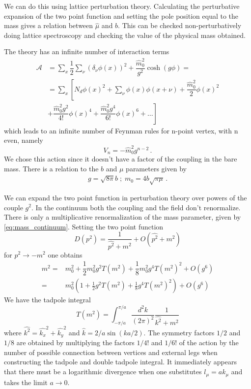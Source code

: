 \documentclass[12pt,a4paper]{report}
\begin{document}
We can do this using lattice perturbation theory. Calculating the perturbative expansion of the two point function and setting the pole position equal to the mass gives a relation between $ \hat \mu$ and $ b$. This can be checked non-perturbatively doing lattice spectroscopy and checking the value of the physical mass obtained.

The theory has an infinite number of interaction terms \begin{align}
\mathcal{A} &= \sum_x \dfrac{1}{2} \sum_\nu  (\delta_\nu \phi(x))^2 + \dfrac{\hat m_0^2}{g^2} \cosh(g \phi) =\\
  &= \sum_x \left[ N_d \phi(x)^2 +  \sum_\nu \phi(x) \phi(x+\nu) +  \dfrac{\hat m_0^2 }{2}\phi(x)^2 \right. \nonumber \\
  &\left. +   \dfrac{ \hat m_0^2 g^2}{4!} \phi(x)^4 +  \dfrac{ \hat m_0^2 g^4}{6!} \phi(x)^6 + \dots  \right]
\end{align} which leads to an infinite number of Feynman rules for n-point vertex, with n even, namely \begin{equation}
V_n = - \hat m_0^2 g^{n-2} \,.
\end{equation} We chose this action since it doesn't have a factor of the coupling in the bare mass. There is a relation to the $b$ and $\mu$  parameters given by \begin{align}
g = \sqrt{8 \pi} b \; ; \; m_0 = 4 b \sqrt{\pi \mu} \,.
\end{align}
 
  We can expand the two point function in perturbation theory over powers of the couple $g^2$. In the continuum both the coupling and the field don't renormalize. There is only a multiplicative renormalization of the mass parameter, given by \eqref{eq:mass_continuum}. Setting the two point function \begin{equation}
  D(p^2) = \dfrac{1}{\hat{p^2}+ m^2} +O(\hat{p^2} +m^2)
\end{equation}  for $p^2 \to -m^2$ one obtains \begin{align}
\label{eq:renormalisedmass}
  m^2=&   m_0^2  +\dfrac{1}{2}   m_0^2 g^2 T( m^2)+ \dfrac{1}{8}  m_0^2 g^4 T( m^2)^2 + O(g^6) \\
 = &  m_0^2 (1 + \frac{1}{2}g^2 T( m^2) + \frac{1}{8} g^4 T( m^2)^2 ) + O(g^6 )
 \end{align} We have  the tadpole integral \begin{equation}
 \label{eq:tadpole}
 T(m^2) = \int_{-\pi/a}^{\pi/a} \dfrac{d^2k}{(2 \pi)^2} \dfrac{1}{\hat{k^2} + m^2
  }
 \end{equation} where $\hat{k^2} = \hat{k_x}^2 + \hat{k_y}^2$ and $\hat k = 2/a \sin (ka/2)$. The symmetry factors $1/2$ and $1/8$ are obtained by multiplying the factors $1/4!$ and $1/6!$ of the action by the number of possible connection between vertices and external legs when constructing the tadpole and double tadpole integral.
 It immediately appears that there must be a logarithmic divergence when one substitutes $l_\mu = a k_\mu$ and takes the limit $a\to 0$. 
\end{document}
